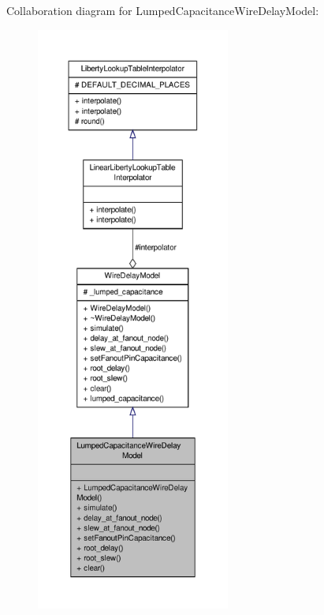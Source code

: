 Collaboration diagram for Lumped\-Capacitance\-Wire\-Delay\-Model\-:\nopagebreak
\begin{figure}[H]
\begin{center}
\leavevmode
\includegraphics[height=550pt]{classLumpedCapacitanceWireDelayModel__coll__graph}
\end{center}
\end{figure}
